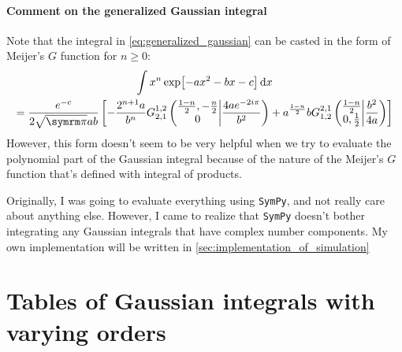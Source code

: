 \paragraph{Comment on the generalized Gaussian integral} Note that the integral in \cref{eq:generalized_gaussian} can be casted in the form of Meijer's $G$ function for $n \geq 0$:
\begin{multline}
    \int x^n\exp[-ax^2 - bx - c]\dd{x} \\= \frac{e^{-c}}{2\sqrt{\cpi}ab}\left[- \frac{2^{n + 1}a}{b^n} {G_{2, 1}^{1, 2}\left(\begin{matrix} \frac{1 - n}{2}, - \frac{n}{2}  \\0 \end{matrix} \middle| {\frac{4 a e^{- 2 i \pi}}{b^{2}}} \right)} + a^{\frac{1 - n}{2}}b {G_{1, 2}^{2, 1}\left(\begin{matrix} \frac{1 - n}{2}\\0, \frac{1}{2}\end{matrix} \middle| {\frac{b^{2}}{4 a}} \right)}\right]
\end{multline}
However, this form doesn't seem to be very helpful when we try to evaluate the polynomial part of the Gaussian integral because of the nature of the Meijer's $G$ function that's defined with integral of products.

Originally, I was going to evaluate everything using \texttt{SymPy}, and not really care about anything else. However, I came to realize that \texttt{SymPy} doesn't bother integrating any Gaussian integrals that have complex number components. My own implementation will be written in \cref{sec:implementation_of_simulation} 

\section{Tables of Gaussian integrals with varying orders}
\label{sec:table_of_gaussian_integrals}

